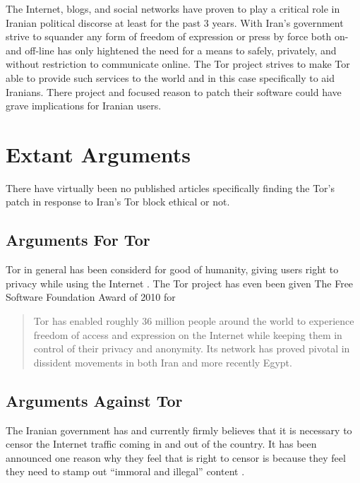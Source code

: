 \documentclass[11pt]{article}
\begin{document}
\begin{multicols}{2}
The Internet, blogs, and social networks have proven to play a critical role in
Iranian political discorse at least for the past 3 years. With Iran's government
strive to squander any form of freedom of expression or press by force both on-
and off-line has only hightened the need for a means to safely, privately, and
without restriction to communicate online. The Tor project strives to make Tor
able to provide such services to the world and in this case specifically to aid
Iranians. There project and focused reason to patch their software could have
grave implications for Iranian users.

\section{Extant Arguments} 

There have virtually been no published articles specifically finding the Tor's
patch in response to Iran's Tor block ethical or not.

\subsection{Arguments For Tor}

Tor in general has been considerd for good of humanity, giving users right to
privacy while using the Internet \cite{TorCreatesSaferInternet, TorLastHope}.
The Tor project has even been given The Free Software Foundation Award of 2010
for 
\begin{quotation}Tor has enabled roughly 36 million people around the world
  to experience freedom of access and expression on the Internet while keeping
  them in control of their privacy and anonymity. Its network has proved pivotal 
  in dissident movements in both Iran and more recently Egypt.\cite{FreeSoftwareAwards}
\end{quotation}



\subsection{Arguments Against Tor}

The Iranian government has and currently firmly believes that it is necessary to
censor the Internet traffic coming in and out of the country. It has been
announced one reason why they feel that is right to censor is because they feel
they need to stamp out ``immoral and illegal'' content
\cite{CensorshipFearsRise}.


\end{multicols}
\end{document}
